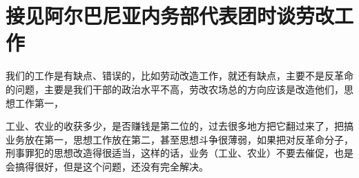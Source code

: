 \section[接见阿尔巴尼亚内务部代表团时谈劳改工作（一九六五年九月十八日）]{接见阿尔巴尼亚内务部代表团时谈劳改工作}


我们的工作是有缺点、错误的，比如劳动改造工作，就还有缺点，主要不是反革命的问题，主要是我们干部的政治水平不高，劳改农场总的方向应该是改造他们，思想工作第一，

工业、农业的收获多少，是否赚钱是第二位的，过去很多地方把它翻过来了，把搞业务放在第一，思想工作放在第二，甚至思想斗争很薄弱，如果把对反革命分子，刑事罪犯的思想改造得很适当，这样的话，业务（工业、农业）不要去催促，也是会搞得很好，但是这个问题，还没有完全解决。


